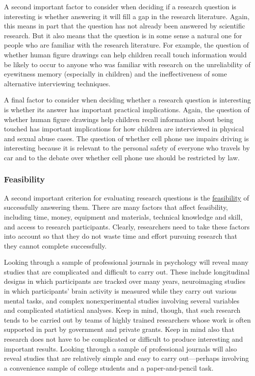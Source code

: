 \documentclass[
]{krantz}
\begin{document}
A second important factor to consider when deciding if a research question is interesting is whether answering it will fill a gap in the research literature. Again, this means in part that the question has not already been answered by scientific research. But it also means that the question is in some sense a natural one for people who are familiar with the research literature. For example, the question of whether human figure drawings can help children recall touch information would be likely to occur to anyone who was familiar with research on the unreliability of eyewitness memory (especially in children) and the ineffectiveness of some alternative interviewing techniques.

A final factor to consider when deciding whether a research question is interesting is whether its answer has important practical implications. Again, the question of whether human figure drawings help children recall information about being touched has important implications for how children are interviewed in physical and sexual abuse cases. The question of whether cell phone use impairs driving is interesting because it is relevant to the personal safety of everyone who travels by car and to the debate over whether cell phone use should be restricted by law.

\subsubsection*{Feasibility}\label{feasibility}


A second important criterion for evaluating research questions is the \hyperref[feasibility]{feasibility} of successfully answering them. There are many factors that affect feasibility, including time, money, equipment and materials, technical knowledge and skill, and access to research participants. Clearly, researchers need to take these factors into account so that they do not waste time and effort pursuing research that they cannot complete successfully.

Looking through a sample of professional journals in psychology will reveal many studies that are complicated and difficult to carry out. These include longitudinal designs in which participants are tracked over many years, neuroimaging studies in which participants' brain activity is measured while they carry out various mental tasks, and complex nonexperimental studies involving several variables and complicated statistical analyses. Keep in mind, though, that such research tends to be carried out by teams of highly trained researchers whose work is often supported in part by government and private grants. Keep in mind also that research does not have to be complicated or difficult to produce interesting and important results. Looking through a sample of professional journals will also reveal studies that are relatively simple and easy to carry out---perhaps involving a convenience sample of college students and a paper-and-pencil task.
\end{document}
